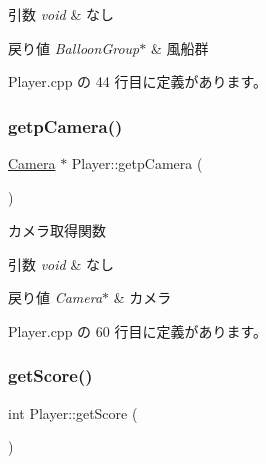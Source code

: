 \begin{DoxyParams}{引数}
{\em void} & なし \\
\hline
\end{DoxyParams}

\begin{DoxyRetVals}{戻り値}
{\em Balloon\+Group$\ast$} & 風船群 \\
\hline
\end{DoxyRetVals}


 Player.\+cpp の 44 行目に定義があります。

\mbox{\label{class_player_aba339bf40ee75457b4c436c68b4670cd}} 
\subsubsection{\texorpdfstring{getp\+Camera()}{getpCamera()}}
{\footnotesize\ttfamily \mbox{\hyperlink{class_camera}{Camera}} $\ast$ Player\+::getp\+Camera (\begin{DoxyParamCaption}{ }\end{DoxyParamCaption})}



カメラ取得関数 


\begin{DoxyParams}{引数}
{\em void} & なし \\
\hline
\end{DoxyParams}

\begin{DoxyRetVals}{戻り値}
{\em Camera$\ast$} & カメラ \\
\hline
\end{DoxyRetVals}


 Player.\+cpp の 60 行目に定義があります。

\mbox{\label{class_player_a97e5447778ae6c384eedc532dcd8431d}} 
\subsubsection{\texorpdfstring{get\+Score()}{getScore()}}
{\footnotesize\ttfamily int Player\+::get\+Score (\begin{DoxyParamCaption}{ }\end{DoxyParamCaption})}



